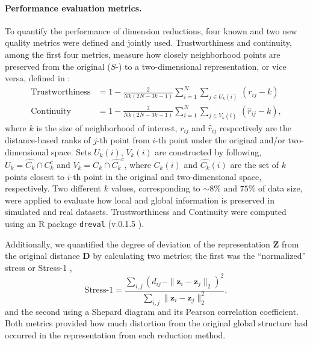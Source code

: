 \documentclass[10pt,letterpaper]{article}
\newcommand{\1}{{\rm 1}\kern-0.24em{\rm I}}
\begin{document}
\paragraph*{Performance evaluation metrics.}
To quantify the performance of dimension reductions, four known \cite{Espadoto21} and two new quality metrics were defined and jointly used. Trustworthiness and continuity, among the first four metrics, measure how closely neighborhood points are preserved from the original ($S$-) to a two-dimensional representation, or vice versa, defined in \cite{Venna01}:
\begin{equation}
\begin{aligned}    
    \text{Trustworthiness} &= 1 - \frac{2}{Nk(2N-3k-1)}\sum_{i=1}^N\sum_{j\in U_k (i)}\, (r_{ij}-k) \\
    \text{Continuity} &= 1 - \frac{2}{Nk(2N-3k-1)}\sum_{i=1}^N\sum_{j\in V_k (i)}\, (\hat{r}_{ij}-k),
    \label{eq:def_venna}
\end{aligned}
\end{equation}
where $k$ is the size of neighborhood of interest, $r_{ij}$ and $\hat{r}_{ij}$ respectively are the distance-based ranks of $j$-th point from $i$-th point under the original and/or two-dimensional space. 
Sets $U_k (i)$, $V_k (i)$ are constructed by following, $U_k = \hat{C_k}\cap C_k^c$ and $V_k = {C_k}\cap \hat{C_k}^c$, where $C_k(i)$ and $\hat{C_k}(i)$ are the set of $k$ points closest to $i$-th point in the original and two-dimensional space, respectively. Two different $k$ values, corresponding to $\sim 8\%$ and $75\%$ of data size, were applied to evaluate how local and global information is preserved in simulated and real datasets.
Trustworthiness and Continuity were computed using an R package \texttt{dreval} (v.0.1.5 \cite{Soneson24}).

Additionally, we quantified the degree of deviation of the representation $\mathbf{Z}$ from the original distance $\mathbf{D}$ by calculating two metrics; the first was the ``normalized'' stress or Stress-1 \cite{borg05c},
\begin{equation}
\text{Stress-1} = \frac{\sum_{i,j} (d_{ij} - \| \mathbf{z}_i - \mathbf{z}_j \|_2)^2}{\sum_{i,j} \| \mathbf{z}_i - \mathbf{z}_j \|_2^2},
\label{eq:mds_stress1}
\end{equation}
and the second using a Shepard diagram \cite{dexter18} and its Pearson correlation coefficient. Both metrics provided how much distortion from the original global structure had occurred in the representation from each reduction method.
\end{document}
